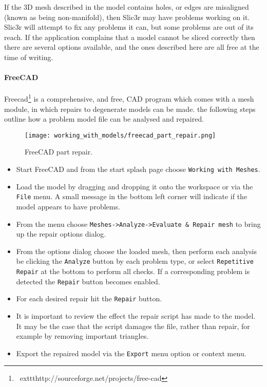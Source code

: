 
If the 3D mesh described in the model contains holes, or edges are misaligned (known as being non-manifold), then Slic3r may have problems working on it.  Slic3r will attempt to fix any problems it can, but some problems are out of its reach.  If the application complains that a model cannot be sliced correctly then there are several options available, and the ones described here are all free at the time of writing.

\paragraph{FreeCAD} %
\label{par:freecad}

Freecad\footnote{\	exttt{http://sourceforge.net/projects/free-cad}} is a comprehensive, and free, CAD program which comes with a mesh module, in which repairs to degenerate models can be made.  the following steps outline how a problem model file can be analysed and repaired.

\begin{figure}[H]
\centering
\texttt{[image: working\_with\_models/freecad\_part\_repair.png]}
\caption{FreeCAD part repair.}
\label{fig:freecad_part_repair}
\end{figure}

\begin{itemize}
	\item Start FreeCAD and from the start splash page choose \texttt{Working with Meshes}.
	\item Load the model by dragging and dropping it onto the workspace or via the \texttt{File} menu.  A small message in the bottom left corner will indicate if the model appears to have problems.
	\item From the menu choose \texttt{Meshes->Analyze->Evaluate \& Repair mesh} to bring up the repair options dialog.
	\item From the options dialog choose the loaded mesh, then perform each analysis be clicking the \texttt{Analyze} button by each problem type, or select \texttt{Repetitive Repair} at the bottom to perform all checks.  If a corresponding problem is detected the \texttt{Repair} button becomes enabled.
	\item For each desired repair hit the \texttt{Repair} button.
	\item It is important to review the effect the repair script has made to the model.  It may be the case that the script damages the file, rather than repair, for example by removing important triangles.
	\item Export the repaired model via the \texttt{Export} menu option or context menu.
\end{itemize}
